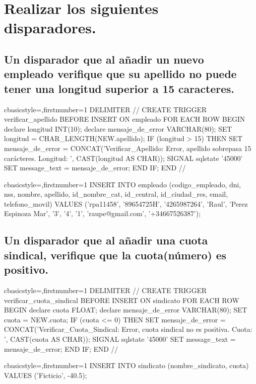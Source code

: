\section{Realizar los siguientes disparadores.}
	\subsection{Un disparador que al añadir un nuevo empleado verifique que su apellido no puede tener una longitud superior a 15 caracteres.}
		\begin{sourcecodep}[]{c}{basicstyle={\fontsize{10}{10}\selectfont\ttfamily},firstnumber=1}{}
			DELIMITER //
			CREATE TRIGGER verificar_apellido BEFORE INSERT ON empleado FOR EACH ROW
			BEGIN
				declare longitud INT(10);
				declare mensaje_de_error VARCHAR(80);
				SET longitud = CHAR_LENGTH(NEW.apellido);
				IF (longitud > 15) THEN
					SET  mensaje_de_error = CONCAT('Verificar_Apellido: Error, apellido sobrepasa 15 carácteres. Longitud: ', CAST(longitud AS CHAR));
					SIGNAL sqlstate '45000' SET message_text = mensaje_de_error;
				END IF;
			END
			//\end{sourcecodep}
		\begin{sourcecodep}[]{c}{basicstyle={\fontsize{10}{10}\selectfont\ttfamily},firstnumber=1}{}
			INSERT INTO empleado (codigo_empleado, dni, nss, nombre, apellido, id_nombre_cat, id_central, id_ciudad_res, email, telefono_movil) 
				VALUES ('rpa11458', '89654725H', '4265987264', 'Raul', 'Perez Espinoza Mar', '3', '4', '1', 'raupe@gmail.com', '+34667526387'); \end{sourcecodep}
	\subsection{Un disparador que al añadir una cuota sindical, verifique que la cuota(número) es positivo.}
		\begin{sourcecodep}[]{c}{basicstyle={\fontsize{10}{10}\selectfont\ttfamily},firstnumber=1}{}
			DELIMITER //
			CREATE TRIGGER verificar_cuota_sindical BEFORE INSERT ON sindicato FOR EACH ROW
			BEGIN
				declare cuota FLOAT;
				declare mensaje_de_error VARCHAR(80);
				SET cuota = NEW.cuota;
				IF (cuota <= 0) THEN
					SET  mensaje_de_error = CONCAT('Verificar_Cuota_Sindical: Error, cuota sindical no es positiva. Cuota: ', CAST(cuota AS CHAR));
					SIGNAL sqlstate '45000' SET message_text = mensaje_de_error;
				END IF;
			END
			//\end{sourcecodep}
		\begin{sourcecodep}[]{c}{basicstyle={\fontsize{10}{10}\selectfont\ttfamily},firstnumber=1}{}
			INSERT INTO sindicato (nombre_sindicato, cuota) VALUES ('Ficticio', -40.5);\end{sourcecodep}
